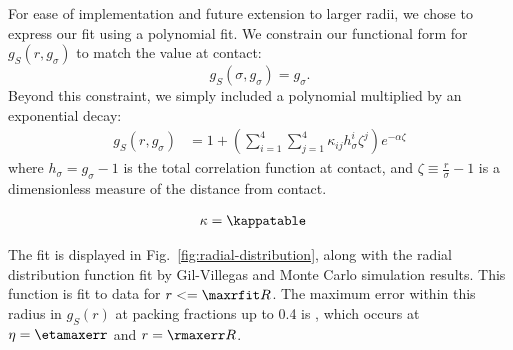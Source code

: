 \documentclass[letterpaper,twocolumn,amsmath,amssymb,pre,aps,10pt]{revtex4-1}
\begin{document}
For ease of implementation and future extension to larger radii, we
chose to express our fit using a polynomial fit.  We constrain our
functional form for $g_S(r, g_\sigma)$ to match the value at contact:
\begin{equation}
  g_S(\sigma, g_\sigma) = g_\sigma.
\end{equation}
Beyond this constraint, we simply included a polynomial multiplied by
an exponential decay:
\begin{align}
  g_S(r,g_\sigma) &=
  1 + \left(\sum_{i=1}^{4} \sum_{j=1}^{4} \kappa_{ij} h_\sigma^i
  \zeta^j\right)e^{-\alpha \zeta} \label{eq:fit-form}
\end{align}
where $h_\sigma = g_\sigma - 1$ is the total correlation function at
contact, and $\zeta \equiv \frac{r}{\sigma}-1$ is a dimensionless
measure of the distance from contact.

\begin{table}
  \begin{align*}
    \kappa &= \kappatable
  \end{align*}
  \caption{The fitted $\kappa_{ij}$ matrix.  In addition to these 12
    parameters, we also optimized the exponetial decay constant
    $\alpha=\alphaval$.
  }
\end{table}

The fit is displayed in Fig.~\ref{fig:radial-distribution}, along with
the radial distribution function fit by Gil-Villegas and Monte Carlo
simulation results.  This function is fit to data for $r <= \maxrfit
R$.  The maximum error within this radius in $g_S(r)$ at packing
fractions up to 0.4 is \maxerr, which occurs at $\eta = \etamaxerr$
and $r = \rmaxerr R$.

\newcommand{\plotcomp}[1]{The top halves of these figures show the
  results of Monte Carlo simulations, while the bottom halves show the
  CVA-S.  On the right are plots of #1 on the paths illustrated in the
  figures to the left.  These plots compare the CVA-S (blue solid line) and CVA
  (cyan dotted line) with Monte Carlo results (black circle)
  and the results of Sokolowski and Fischer
  (red dashed line)~\cite{sokolowski1992role}, and those of Fischer and Methfessel
  (green dot-dashed line)~\cite{fischer1980born}.  The latter is only plotted at
  contact, where it is defined}
\end{document}
